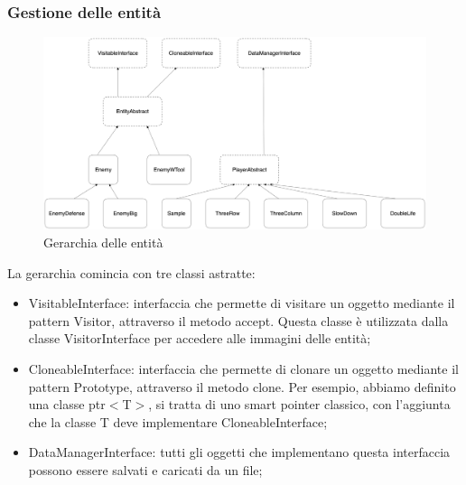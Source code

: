 \documentclass[11pt]{article}
\begin{document}
\subsubsection{Gestione delle entità}
\begin{figure}[ht]
	\centering
	\includegraphics[width=\textwidth]{assets/entity}
	\caption{Gerarchia delle entità}
\end{figure}

La gerarchia comincia con tre classi astratte:
\begin{itemize}
	\item VisitableInterface: interfaccia che permette di visitare un oggetto
		mediante il pattern Visitor, attraverso il metodo accept. Questa classe
		è utilizzata dalla classe VisitorInterface per accedere alle immagini 
		delle entità;

	\item CloneableInterface: interfaccia che permette di clonare un oggetto
		mediante il pattern Prototype, attraverso il metodo clone. Per esempio,
		abbiamo definito una classe ptr$<$T$>$, si tratta di uno smart pointer
		classico, con l'aggiunta che la classe T deve implementare
		CloneableInterface;

	\item DataManagerInterface: tutti gli oggetti che implementano questa
		interfaccia possono essere salvati e caricati da un file;
\end{itemize}
\end{document}
